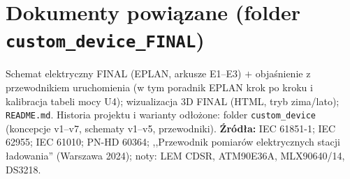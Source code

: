 \documentclass[11pt,a4paper]{article}
\begin{document}
\section{Dokumenty powiązane (folder \texttt{custom\_device\_FINAL})}
Schemat elektryczny FINAL (EPLAN, arkusze E1--E3) $+$ objaśnienie z przewodnikiem uruchomienia
(w tym poradnik EPLAN krok po kroku i kalibracja tabeli mocy U4); wizualizacja 3D FINAL
(HTML, tryb zima/lato); \texttt{README.md}. Historia projektu i warianty odłożone: folder
\texttt{custom\_device} (koncepcje v1--v7, schematy v1--v5, przewodniki). \textbf{Źródła:}
IEC 61851-1; IEC 62955; IEC 61010; PN-HD 60364; ,,Przewodnik pomiarów elektrycznych stacji
ładowania'' (Warszawa 2024); noty: LEM CDSR, ATM90E36A, MLX90640/14, DS3218.
\end{document}
